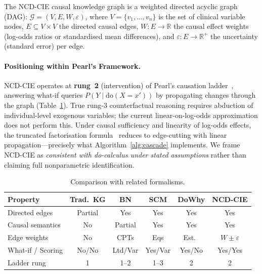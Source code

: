 \documentclass[runningheads]{llncs}
\begin{document}
The NCD-CIE causal knowledge graph is a weighted directed
acyclic graph (DAG):
$\mathcal{G} = (V, E, W, \varepsilon)$,
where $V=\{v_1,\ldots,v_n\}$ is the set of clinical variable nodes,
$E \subseteq V \times V$ the directed causal edges,
$W: E \rightarrow \mathbb{R}$ the causal effect weights
(log-odds ratios or standardised mean differences), and
$\varepsilon: E \rightarrow \mathbb{R}^+$ the uncertainty
(standard error) per edge.

\paragraph{Positioning within Pearl's Framework.}
NCD-CIE operates at \textbf{rung~2} (intervention) of Pearl's
causation ladder~\cite{pearl2018book}, answering what-if queries
$P(Y \mid \mathrm{do}(X = x'))$ by propagating changes through the
graph (Table~\ref{tab:comparison}).
True rung-3 counterfactual reasoning requires abduction of
individual-level exogenous variables; the current linear-on-log-odds
approximation does not perform this.
Under causal sufficiency and linearity of log-odds effects, the
truncated factorisation formula~\cite{pearl2009causality} reduces to
edge-cutting with linear propagation---precisely what
Algorithm~\ref{alg:cascade} implements.
We frame NCD-CIE as \emph{consistent with do-calculus under stated
assumptions} rather than claiming full nonparametric identification.

\renewcommand{\arraystretch}{1.1}
\begin{table}[t]
\centering
\caption{Comparison with related formalisms.}
\label{tab:comparison}
\small
\begin{tabular}{@{}lccccc@{}}
\toprule
\textbf{Property} & \textbf{Trad.\ KG} & \textbf{BN} & \textbf{SCM} & \textbf{DoWhy} & \textbf{NCD-CIE} \\
\midrule
Directed edges       & Partial & Yes & Yes & Yes & Yes \\
Causal semantics     & No      & Partial & Yes & Yes & Yes \\
Edge weights         & No      & CPTs & Eqs & Est.\ & $W \pm \varepsilon$ \\
What-if / Scoring    & No/No   & Ltd/Var & Yes/Var & Yes/No & Yes/Yes \\
Ladder rung          & 1       & 1--2 & 1--3 & 2  & 2 \\
\bottomrule
\end{tabular}
\end{table}
\renewcommand{\arraystretch}{1.0}
\end{document}
